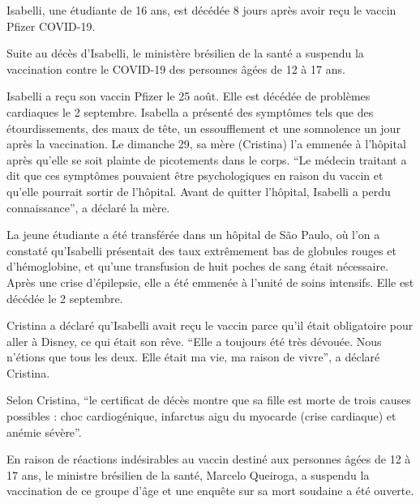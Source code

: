 Isabelli, une étudiante de 16 ans, est décédée 8 jours après avoir reçu le
vaccin Pfizer COVID-19.

Suite au décès d'Isabelli, le ministère brésilien de la santé a suspendu la
vaccination contre le COVID-19 des personnes âgées de 12 à 17 ans.

Isabelli a reçu son vaccin Pfizer le 25 août. Elle est décédée de problèmes
cardiaques le 2 septembre. Isabella a présenté des symptômes tels que des
étourdissements, des maux de tête, un essoufflement et une somnolence un jour
après la vaccination. Le dimanche 29, sa mère (Cristina) l'a emmenée à l'hôpital
après qu'elle se soit plainte de picotements dans le corps. “Le médecin traitant
a dit que ces symptômes pouvaient être psychologiques en raison du vaccin et
qu'elle pourrait sortir de l'hôpital. Avant de quitter l'hôpital, Isabelli a
perdu connaissance”, a déclaré la mère.

La jeune étudiante a été transférée dans un hôpital de São Paulo, où l'on a
constaté qu'Isabelli présentait des taux extrêmement bas de globules rouges et
d'hémoglobine, et qu'une transfusion de huit poches de sang était
nécessaire. Après une crise d'épilepsie, elle a été emmenée à l'unité de soins
intensifs. Elle est décédée le 2 septembre.

Cristina a déclaré qu'Isabelli avait reçu le vaccin parce qu'il était
obligatoire pour aller à Disney, ce qui était son rêve. “Elle a toujours été
très dévouée. Nous n'étions que tous les deux. Elle était ma vie, ma raison de
vivre”, a déclaré Cristina.

Selon Cristina, “le certificat de décès montre que sa fille est morte de trois
causes possibles : choc cardiogénique, infarctus aigu du myocarde (crise
cardiaque) et anémie sévère”.

En raison de réactions indésirables au vaccin destiné aux personnes âgées de 12
à 17 ans, le ministre brésilien de la santé, Marcelo Queiroga, a suspendu la
vaccination de ce groupe d'âge et une enquête sur sa mort soudaine a été
ouverte.

